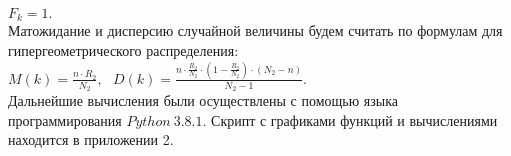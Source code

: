 \documentclass{article}
\begin{document}
\begin{math}
 F_{k} = 1.
 \end{math}
\vspace{\baselineskip}
\\
Матожидание и дисперсию случайной величины будем считать по формулам для гипергеометрического распределения:
\vspace{\baselineskip}
\\
\begin{math}
M(k) = \displaystyle\frac{n\cdot R_2}{N_2}, \ \ \  D(k) = \displaystyle\frac{n\cdot \displaystyle\frac{R_2}{N_2} \cdot \left( 1 - \displaystyle\frac{R_2}{N_2} \right) \cdot (N_2 - n)}{N_2 - 1}.
\end{math}
\vspace{\baselineskip}
\\
Дальнейшие вычисления были осуществлены с помощью языка программирования \begin{math}
 Python \ 3.8.1
\end{math}. Скрипт с графиками функций и вычислениями находится в приложении 2.
\vspace{\baselineskip}\vspace{\baselineskip}\vspace{\baselineskip}\vspace{\baselineskip}\vspace{\baselineskip}\vspace{\baselineskip}\vspace{\baselineskip}\vspace{\baselineskip}\vspace{\baselineskip}\vspace{\baselineskip}\vspace{\baselineskip}\vspace{\baselineskip}\vspace{\baselineskip}\vspace{\baselineskip}\vspace{\baselineskip}\vspace{\baselineskip}\vspace{\baselineskip}\vspace{\baselineskip}\vspace{\baselineskip}\vspace{\baselineskip}\vspace{\baselineskip}\vspace{\baselineskip}\vspace{\baselineskip}\vspace{\baselineskip}\vspace{\baselineskip}\vspace{\baselineskip}\vspace{\baselineskip}\vspace{\baselineskip}\vspace{\baselineskip}\vspace{\baselineskip}\vspace{\baselineskip}\vspace{\baselineskip}\vspace{\baselineskip}\vspace{\baselineskip}
\end{document}
